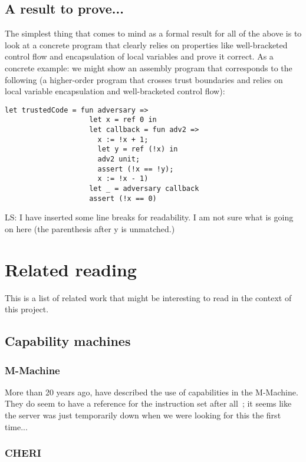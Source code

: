 \documentclass[a4paper]{article}
\newcommand\lau[1]{{\color{purple} \sf \footnotesize {LS: #1}}\\}
\begin{document}
\subsection{A result to prove...}
\label{sec:os-less-stack-property}

The simplest thing that comes to mind as a formal result for all of the above is
to look at a concrete program that clearly relies on properties like
well-bracketed control flow and encapsulation of local variables and prove it
correct. As a concrete example: we might show an assembly program that
corresponds to the following (a higher-order program that crosses trust
boundaries and relies on local variable encapsulation and well-bracketed control
flow):
\begin{verbatim}
let trustedCode = fun adversary =>
                    let x = ref 0 in
                    let callback = fun adv2 => 
                      x := !x + 1; 
                      let y = ref (!x) in 
                      adv2 unit; 
                      assert (!x == !y); 
                      x := !x - 1)
                    let _ = adversary callback
                    assert (!x == 0)
\end{verbatim}
\lau{I have inserted some line breaks for readability. I am not sure what is going on here (the parenthesis after y is unmatched.)}
\section{Related reading}
\label{sec:related-reading}

This is a list of related work that might be interesting to read in the context
of this project.

\subsection{Capability machines}
\label{sec:rw-cap-machines}

\subsubsection{M-Machine}
More than 20 years ago, \cite{Carter:1994:HSF:195473.195579} have described the
use of capabilities in the M-Machine. They do seem to have a reference for the
instruction set after all~\citep{Dally1997Memo59}; it seems like the server was
just temporarily down when we were looking for this the first time...

\subsubsection{CHERI}
\end{document}
